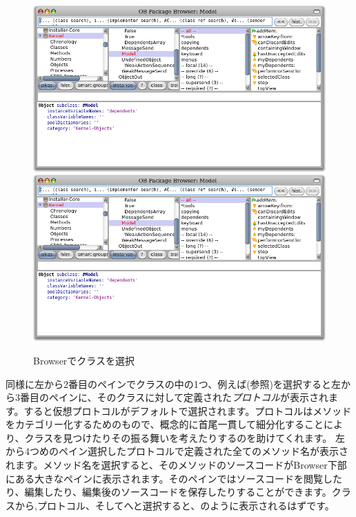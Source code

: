 \documentclass[a4paper,10pt,twoside]{book}
\begin{document}
\begin{figure}[htbp]
   \centering
   \ifluluelse
	   {\includegraphics[width=\textwidth]{SystemBrowser1} }
	   {\includegraphics[width=.7\textwidth]{SystemBrowser1} }
   \caption{Browserでクラスを選択
   }
\end{figure}

同様に左から2番目のペインでクラスの中の1つ、例えば(参照)を選択すると左から3番目のペインに、そのクラスに対して定義された\emph{プロトコル}が表示されます。すると仮想プロトコルがデフォルトで選択されます。プロトコルはメソッドをカテゴリー化するためのもので、概念的に首尾一貫して細分化することにより、クラスを見つけたりその振る舞いを考えたりするのを助けてくれます。
左から4つめのペイン選択したプロトコルで定義された全てのメソッド名が表示されます。メソッド名を選択すると、そのメソッドのソースコードがBrowser下部にある大きなペインに表示されます。そのペインではソースコードを閲覧したり、編集したり、編集後のソースコードを保存したりすることができます。クラスから,プロトコル、そしてへと選択すると、のように表示されるはずです。
\end{document}
